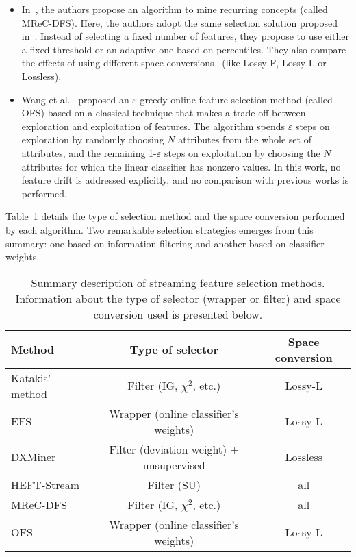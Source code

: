 \documentclass[preprint,12pt]{elsarticle}
\begin{document}
\begin{itemize}
	\item In~\cite{gomes14}, the authors propose an algorithm to mine recurring concepts (called MReC-DFS). Here, the authors adopt the same selection solution proposed in~\cite{kata05}. Instead of selecting a fixed number of features, they propose to use either a fixed threshold or an adaptive one based on percentiles. They also compare the effects of using different space conversions~\cite{masud10} (like Lossy-F, Lossy-L or Lossless).
	\item Wang et al.~\cite{wang14} proposed an $\varepsilon$-greedy online feature selection method (called OFS) based on a classical technique that makes a trade-off between exploration and exploitation of features. The algorithm spends $\varepsilon$ steps on exploration by randomly choosing $N$ attributes from the whole set of attributes, and the remaining 1-$\varepsilon$ steps on exploitation by choosing the $N$ attributes for which the linear classifier has nonzero values. %
In this work, no feature drift is addressed explicitly, and no comparison with previous works is performed.
\end{itemize}

Table~\ref{tab:fs} details the type of selection method and the space conversion performed by each algorithm. Two remarkable selection strategies emerges from this summary: one based on information filtering and another based on classifier weights. 

\begin{table}[!htp]
\renewcommand{\arraystretch}{1.3}
\centering
\scriptsize
\caption{Summary description of streaming feature selection methods. Information about the type of selector (wrapper or filter) and space conversion used is presented below.}
\label{tab:fs}
\begin{tabular}{ lcc }
\toprule
{\bf Method} & {\bf Type of selector} & {\bf Space conversion}\\
\midrule
Katakis' method~\cite{kata05} & Filter (IG, $\chi^2$, etc.) & Lossy-L\\
EFS~\cite{carva06} & Wrapper (online classifier's weights) & Lossy-L\\
DXMiner~\cite{masud10} & Filter (deviation weight) + unsupervised & Lossless\\
HEFT-Stream~\cite{nguyen12} & Filter (SU) & all\\
MReC-DFS~\cite{gomes14} & Filter (IG, $\chi^2$, etc.) & all\\
OFS~\cite{wang14} & Wrapper (online classifier's weights) & Lossy-L\\
\bottomrule
\end{tabular}
\end{table}
\end{document}
